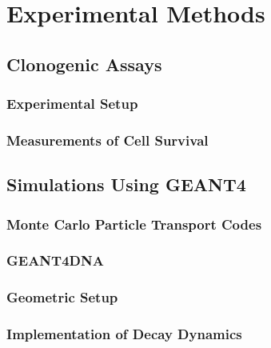 \chapter{Experimental Methods}
\label{p1:methods}

\section{Clonogenic Assays}

\subsection{Experimental Setup}

\subsection{Measurements of Cell Survival}


\section{Simulations Using GEANT4}

\subsection{Monte Carlo Particle Transport Codes}

\subsection{GEANT4DNA}

\subsection{Geometric Setup}

\subsection{Implementation of Decay Dynamics}



